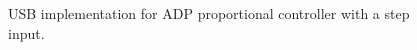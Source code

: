 \begin{figure}[!htbp]
{    \label{fig:PitchVoltage_ADP_RMSE_Step}
    }    
    \caption{USB implementation for ADP proportional controller with a step input.}
    \label{fig:ADP_USB_Step}
\end{figure}


